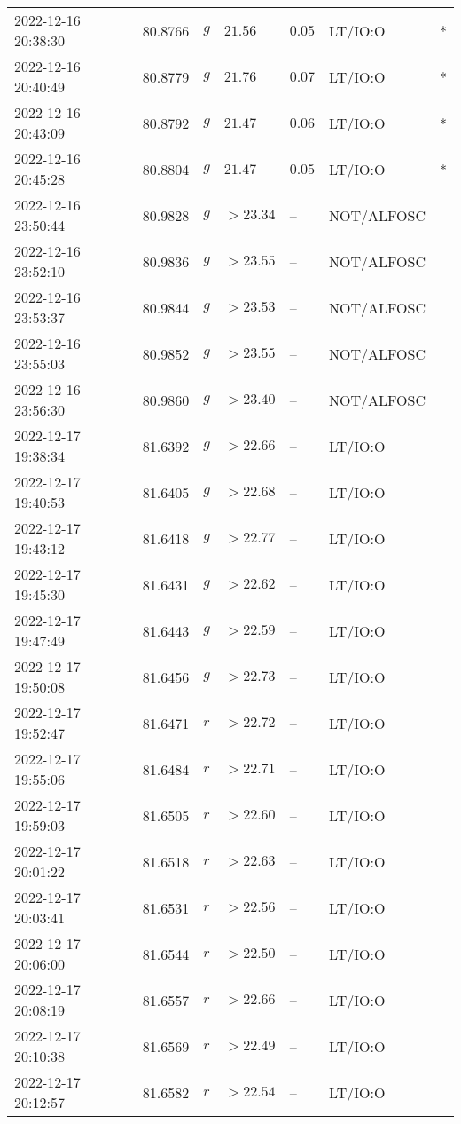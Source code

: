 \documentclass{nature_plusfigure}
\begin{document}
\begin{supplement}
\begin{center}
\begin{longtable}{lllllll}
2022-12-16 20:38:30 & 80.8766 & $g$ & $21.56$ & $0.05$ & LT/IO:O & * \\ 
2022-12-16 20:40:49 & 80.8779 & $g$ & $21.76$ & $0.07$ & LT/IO:O & * \\ 
2022-12-16 20:43:09 & 80.8792 & $g$ & $21.47$ & $0.06$ & LT/IO:O & * \\ 
2022-12-16 20:45:28 & 80.8804 & $g$ & $21.47$ & $0.05$ & LT/IO:O & * \\ 
2022-12-16 23:50:44 & 80.9828 & $g$ & $>23.34$ & -- & NOT/ALFOSC &  \\ 
2022-12-16 23:52:10 & 80.9836 & $g$ & $>23.55$ & -- & NOT/ALFOSC &  \\ 
2022-12-16 23:53:37 & 80.9844 & $g$ & $>23.53$ & -- & NOT/ALFOSC &  \\ 
2022-12-16 23:55:03 & 80.9852 & $g$ & $>23.55$ & -- & NOT/ALFOSC &  \\ 
2022-12-16 23:56:30 & 80.9860 & $g$ & $>23.40$ & -- & NOT/ALFOSC &  \\ 
2022-12-17 19:38:34 & 81.6392 & $g$ & $>22.66$ & -- & LT/IO:O &  \\ 
2022-12-17 19:40:53 & 81.6405 & $g$ & $>22.68$ & -- & LT/IO:O &  \\ 
2022-12-17 19:43:12 & 81.6418 & $g$ & $>22.77$ & -- & LT/IO:O &  \\ 
2022-12-17 19:45:30 & 81.6431 & $g$ & $>22.62$ & -- & LT/IO:O &  \\ 
2022-12-17 19:47:49 & 81.6443 & $g$ & $>22.59$ & -- & LT/IO:O &  \\ 
2022-12-17 19:50:08 & 81.6456 & $g$ & $>22.73$ & -- & LT/IO:O &  \\ 
2022-12-17 19:52:47 & 81.6471 & $r$ & $>22.72$ & -- & LT/IO:O &  \\ 
2022-12-17 19:55:06 & 81.6484 & $r$ & $>22.71$ & -- & LT/IO:O &  \\ 
2022-12-17 19:59:03 & 81.6505 & $r$ & $>22.60$ & -- & LT/IO:O &  \\ 
2022-12-17 20:01:22 & 81.6518 & $r$ & $>22.63$ & -- & LT/IO:O &  \\ 
2022-12-17 20:03:41 & 81.6531 & $r$ & $>22.56$ & -- & LT/IO:O &  \\ 
2022-12-17 20:06:00 & 81.6544 & $r$ & $>22.50$ & -- & LT/IO:O &  \\ 
2022-12-17 20:08:19 & 81.6557 & $r$ & $>22.66$ & -- & LT/IO:O &  \\ 
2022-12-17 20:10:38 & 81.6569 & $r$ & $>22.49$ & -- & LT/IO:O &  \\ 
2022-12-17 20:12:57 & 81.6582 & $r$ & $>22.54$ & -- & LT/IO:O &  \\ 

\end{longtable}
\end{center}
\end{supplement}
\end{document}
